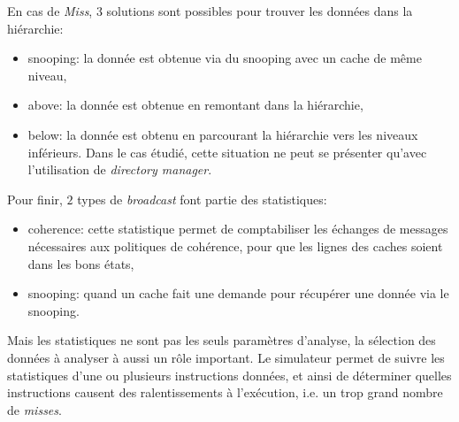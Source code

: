 En cas de \emph{Miss}, $3$ solutions sont possibles pour trouver les données dans la hiérarchie:
\begin{itemize}
\item snooping: la donnée est obtenue via du snooping avec un cache de même niveau,
\item above: la donnée est obtenue en remontant dans la hiérarchie,
\item below: la donnée est obtenu en parcourant la hiérarchie vers les niveaux inférieurs. Dans le cas étudié, cette situation ne peut se présenter qu'avec l'utilisation de \emph{directory manager}. \\
\end{itemize}

Pour finir, $2$ types de \emph{broadcast} font partie des statistiques:
\begin{itemize}
\item coherence: cette statistique permet de comptabiliser les échanges de messages nécessaires aux politiques de cohérence, pour que les lignes des caches soient dans les bons états,
\item snooping: quand un cache fait une demande pour récupérer une donnée via le snooping. \\
\end{itemize}


Mais les statistiques ne sont pas les seuls paramètres d'analyse, la sélection des données à analyser à aussi un rôle important. Le simulateur permet de suivre les statistiques d'une ou plusieurs instructions données, et ainsi de déterminer quelles instructions causent des ralentissements à l'exécution, i.e. un trop grand nombre de \emph{misses}.


